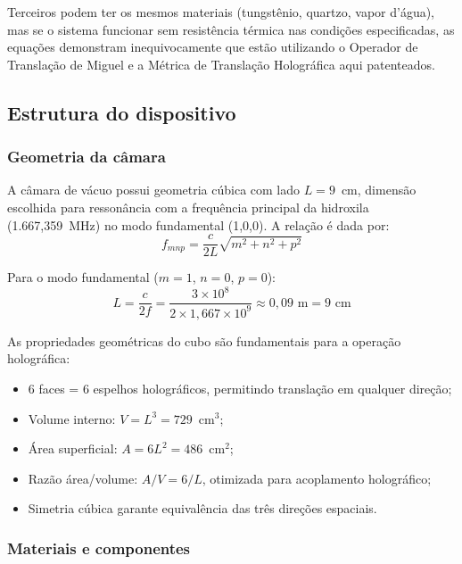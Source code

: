 \documentclass[12pt,a4paper]{article}
\begin{document}
Terceiros podem ter os mesmos materiais (tungstênio, quartzo,
vapor d'água), mas se o sistema funcionar sem resistência
térmica nas condições especificadas, as equações demonstram
inequivocamente que estão utilizando o Operador de Translação
de Miguel e a Métrica de Translação Holográfica aqui
patenteados.

\subsection{Estrutura do dispositivo}

\subsubsection{Geometria da câmara}

A câmara de vácuo possui geometria cúbica com lado $L = 9$~cm,
dimensão escolhida para ressonância com a frequência principal
da hidroxila (1.667,359~MHz) no modo fundamental (1,0,0).
A relação é dada por:
\begin{equation}
f_{mnp} = \frac{c}{2L}\sqrt{m^2 + n^2 + p^2}
\label{eq:freq_modo}
\end{equation}

Para o modo fundamental ($m=1$, $n=0$, $p=0$):
\begin{equation}
L = \frac{c}{2f} = \frac{3\times10^8}{2\times1{,}667\times10^9}
  \approx 0{,}09 \text{ m} = 9 \text{ cm}
\label{eq:lado}
\end{equation}

As propriedades geométricas do cubo são fundamentais para a
operação holográfica:

\begin{itemize}[nosep]
\item 6 faces = 6 espelhos holográficos, permitindo translação
  em qualquer direção;
\item Volume interno: $V = L^3 = 729$~cm$^3$;
\item Área superficial: $A = 6L^2 = 486$~cm$^2$;
\item Razão área/volume: $A/V = 6/L$, otimizada para
  acoplamento holográfico;
\item Simetria cúbica garante equivalência das três direções
  espaciais.
\end{itemize}

\subsubsection{Materiais e componentes}
\end{document}
